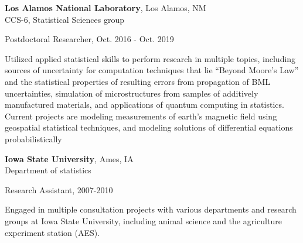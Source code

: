 \documentclass[11pt]{article}
\makeatletter
\newlength{\bibhang}
\newlength{\bibsep}
 {\@listi \global\bibsep\itemsep \global\advance\bibsep by\parsep}
\newenvironment{bibsection}
    {\minipage[t]{\linewidth}\list{}{%
        \setlength{\leftmargin}{\bibhang}%
        \setlength{\itemindent}{-\leftmargin}%
        \setlength{\itemsep}{\bibsep}%
        \setlength{\parsep}{\z@}%
        }}
    {\endlist\endminipage}
\renewcommand{\section}[2]%
        {\pagebreak[2]\vspace{1.3\baselineskip}%
         \phantomsection\addcontentsline{toc}{section}{#1}%
         \hspace{0in}%
         \marginpar{
         \raggedright \scshape #1}#2}
\newenvironment{outerlist}[1][\enskip\textbullet]%
        {\begin{itemize}[#1]}{\end{itemize}%
         \vspace{-.6\baselineskip}}
\newenvironment{innerlist}[1][\enskip\textbullet]%
        {\begin{compactitem}[#1]}{\end{compactitem}}
\makeatother
\begin{document}
\textbf{Los Alamos National Laboratory}, Los Alamos, NM\\
CCS-6, Statistical Sciences group 
	\begin{outerlist}
		 \item[] Postdoctoral Researcher, Oct. 2016 - Oct. 2019
		 \begin{innerlist}
		\item Utilized applied statistical skills to perform research in multiple topics, including sources of uncertainty for computation techniques that lie ``Beyond Moore’s Law'' and the statistical properties of resulting errors from propagation of BML uncertainties, simulation of microstructures from samples of additively manufactured materials, and applications of quantum computing in statistics. Current projects are modeling measurements of earth's magnetic field using geospatial statistical techniques, and modeling solutions of differential equations probabilistically
		\end{innerlist}
	\end{outerlist}
\vspace{0.1in}
\textbf{Iowa State University}, Ames, IA\\
Department of statistics 
	\begin{outerlist}
		 \item[] Research Assistant, 2007-2010
		 \begin{innerlist}
			\item Engaged in multiple consultation projects with various departments and research groups at Iowa State University, including animal science and the agriculture experiment station (AES).
		\end{innerlist}
	\end{outerlist}


\end{document}
